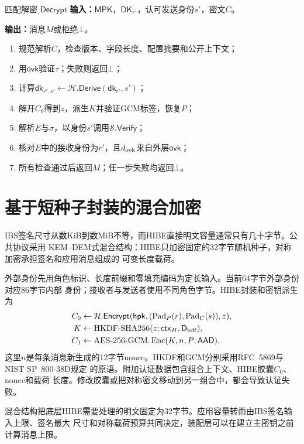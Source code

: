 \begin{ibmealgorithm}{匹配解密 $\mathsf{Decrypt}$}
\label{alg:decrypt}
\textbf{输入：}$\mathsf{MPK}$，$\mathsf{DK}_{r'}$，认可发送身份$s'$，密文$C$。\par
\textbf{输出：}消息$M$或拒绝$\bot$。
\begin{enumerate}
  \item 规范解析$C$，检查版本、字段长度、配置摘要和公开上下文；
  \item 用$\mathsf{ovk}$验证$\tau$；失败则返回$\bot$；
  \item 计算$\mathsf{dk}_{r',s'}\leftarrow\mathcal H.\mathsf{Derive}(\mathsf{dk}_{r'},s')$；
  \item 解开$C_0$得到$z$，派生$K$并验证GCM标签，恢复$P$；
  \item 解析$E$与$\sigma$，以身份$s'$调用$\mathcal S.\mathsf{Verify}$；
  \item 核对$E$中的接收身份为$r'$，且$d_{\rm ovk}$来自外层$\mathsf{ovk}$；
  \item 所有检查通过后返回$M$；任一步失败均返回$\bot$。
\end{enumerate}
\end{ibmealgorithm}

\section{基于短种子封装的混合加密}

IBS签名尺寸从数KiB到数MiB不等，而HIBE直接明文容量通常只有几十字节。公共协议采用
KEM--DEM式混合结构：HIBE只加密固定的32字节随机种子，对称加密承担签名和应用消息组成的
可变长度载荷。

外部身份先用角色标识、长度前缀和零填充编码为定长输入。当前64字节外部身份对应86字节内部
身份；接收者与发送者使用不同角色字节。HIBE封装和密钥派生为
\begin{align*}
 C_0&\leftarrow\mathcal H.\mathsf{Encrypt}
       (\mathsf{hpk},(\operatorname{Pad}_P(r),\operatorname{Pad}_C(s)),z),\\
 K&\leftarrow\operatorname{HKDF\text{-}SHA256}(z;\mathsf{ctx}_H,\mathsf D_{\rm kdf}),\\
 C_1&\leftarrow\operatorname{AES\text{-}256\text{-}GCM.Enc}(K,n,P;\mathsf{AAD}).
\end{align*}
这里$n$是每条消息新生成的12字节nonce。HKDF和GCM分别采用RFC~5869与NIST SP~800-38D规定
的原语\cite{rfc5869,nist2007gcm}。附加认证数据包含组合上下文、HIBE胶囊$C_0$、nonce和载荷
长度。修改胶囊或把对称密文移动到另一组合中，都会导致认证失败。

混合结构把底层HIBE需要处理的明文固定为32字节。应用容量转而由IBS签名输入上限、签名最大
尺寸和对称载荷预算共同决定，装配层可以在建立主密钥之前计算消息上限。

